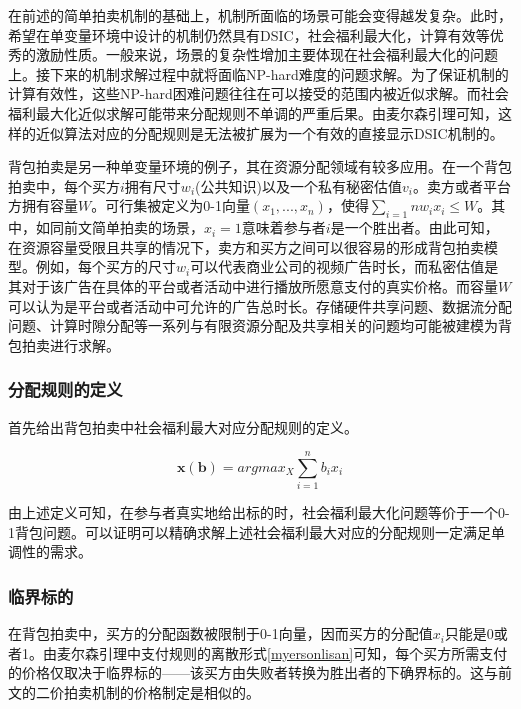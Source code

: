 \documentclass[promaster]{thesis-uestc}
\begin{document}
在前述的简单拍卖机制的基础上，机制所面临的场景可能会变得越发复杂。此时，希望在单变量环境中设计的机制仍然具有DSIC，社会福利最大化，计算有效等优秀的激励性质。一般来说，场景的复杂性增加主要体现在社会福利最大化的问题上。接下来的机制求解过程中就将面临NP-hard难度的问题求解。为了保证机制的计算有效性，这些NP-hard困难问题往往在可以接受的范围内被近似求解。而社会福利最大化近似求解可能带来分配规则不单调的严重后果。由麦尔森引理可知，这样的近似算法对应的分配规则是无法被扩展为一个有效的直接显示DSIC机制的。

背包拍卖是另一种单变量环境的例子，其在资源分配领域有较多应用。在一个背包拍卖中，每个买方$i$拥有尺寸$w_i$(公共知识)以及一个私有秘密估值$v_i$。卖方或者平台方拥有容量$W$。可行集被定义为0-1向量$(x_1,...,x_n)$，使得$\sum_{i=1}{n}{w_ix_i}\leq W$。其中，如同前文简单拍卖的场景，$x_i=1$意味着参与者$i$是一个胜出者。由此可知，在资源容量受限且共享的情况下，卖方和买方之间可以很容易的形成背包拍卖模型。例如，每个买方的尺寸$w_i$可以代表商业公司的视频广告时长，而私密估值是其对于该广告在具体的平台或者活动中进行播放所愿意支付的真实价格。而容量$W$可以认为是平台或者活动中可允许的广告总时长。存储硬件共享问题、数据流分配问题、计算时隙分配等一系列与有限资源分配及共享相关的问题均可能被建模为背包拍卖进行求解。

\subsubsection{分配规则的定义}

首先给出背包拍卖中社会福利最大对应分配规则的定义。

\begin{definition}[背包拍卖对应的分配规则]
    $$\mathbf{x(b)}=argmax_X{\sum_{i=1}^{n}{b_ix_i}}$$
\end{definition}

由上述定义可知，在参与者真实地给出标的时，社会福利最大化问题等价于一个0-1背包问题。可以证明可以精确求解上述社会福利最大对应的分配规则一定满足单调性的需求。

\subsubsection{临界标的}
在背包拍卖中，买方的分配函数被限制于0-1向量，因而买方的分配值$x_i$只能是0或者1。由麦尔森引理中支付规则的离散形式\ref{myersonlisan}可知，每个买方所需支付的价格仅取决于临界标的——该买方由失败者转换为胜出者的下确界标的。这与前文的二价拍卖机制的价格制定是相似的。
\end{document}

